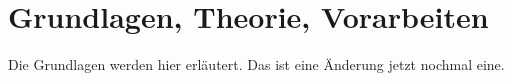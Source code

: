 \chapter{Grundlagen, Theorie, Vorarbeiten}\label{ch:ch2}
Die Grundlagen werden hier erläutert. Das ist eine Änderung jetzt nochmal eine.



